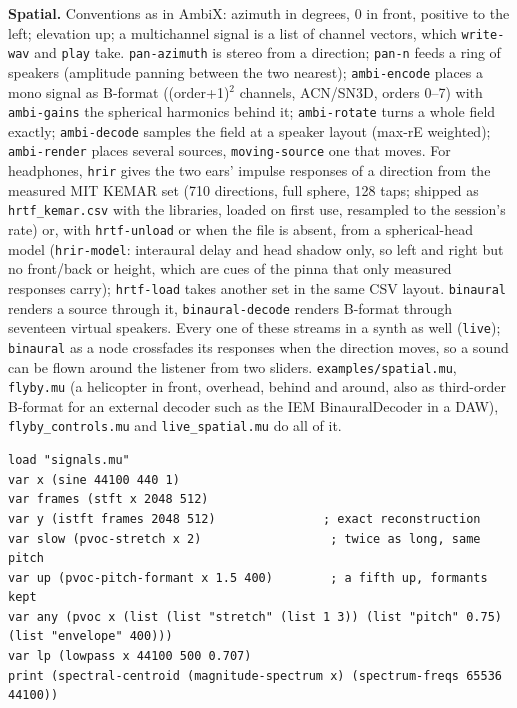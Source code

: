 \documentclass[11pt,a4paper]{article}
\newcommand{\musil}[1]{\lstinline[style=musilinline]{#1}}
\begin{document}
\textbf{Spatial.} Conventions as in AmbiX: azimuth in degrees, 0 in front, positive to
the left; elevation up; a multichannel signal is a list of channel vectors, which
\musil{write-wav} and \musil{play} take. \musil{pan-azimuth} is stereo from a direction;
\musil{pan-n} feeds a ring of speakers (amplitude panning between the two nearest);
\musil{ambi-encode} places a mono signal as B-format ((order+1)$^2$ channels, ACN/SN3D,
orders 0--7) with \musil{ambi-gains} the spherical harmonics behind it; \musil{ambi-rotate}
turns a whole field exactly; \musil{ambi-decode} samples the field at a speaker layout
(max-rE weighted); \musil{ambi-render} places several sources, \musil{moving-source} one
that moves. For headphones, \musil{hrir} gives the two ears' impulse responses of a direction from
the measured MIT KEMAR set (710 directions, full sphere, 128 taps; shipped as
\texttt{hrtf\_kemar.csv} with the libraries, loaded on first use, resampled to the
session's rate) or, with \musil{hrtf-unload} or when the file is absent, from a
spherical-head model (\musil{hrir-model}: interaural delay and head shadow only, so left
and right but no front/back or height, which are cues of the pinna that only measured
responses carry); \musil{hrtf-load} takes another set in the same CSV layout.
\musil{binaural} renders a source through it, \musil{binaural-decode} renders B-format
through seventeen virtual speakers. Every one of these streams in a synth as well (\musil{live});
\musil{binaural} as a node crossfades its responses when the direction moves, so a sound
can be flown around the listener from two sliders. \texttt{examples/spatial.mu},
\texttt{flyby.mu} (a helicopter in front, overhead, behind and around, also as third-order
B-format for an external decoder such as the IEM BinauralDecoder in a DAW),
\texttt{flyby\_controls.mu} and \texttt{live\_spatial.mu} do all of it.

\begin{lstlisting}
load "signals.mu"
var x (sine 44100 440 1)
var frames (stft x 2048 512)
var y (istft frames 2048 512)               ; exact reconstruction
var slow (pvoc-stretch x 2)                  ; twice as long, same pitch
var up (pvoc-pitch-formant x 1.5 400)        ; a fifth up, formants kept
var any (pvoc x (list (list "stretch" (list 1 3)) (list "pitch" 0.75) (list "envelope" 400)))
var lp (lowpass x 44100 500 0.707)
print (spectral-centroid (magnitude-spectrum x) (spectrum-freqs 65536 44100))
\end{lstlisting}
\end{document}
